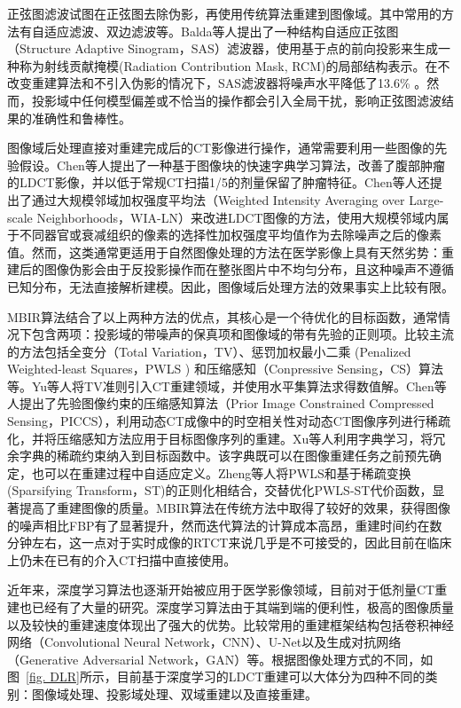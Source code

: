 正弦图滤波试图在正弦图去除伪影，再使用传统算法重建到图像域。其中常用的方法有自适应滤波、双边滤波等。Balda等人提出了一种结构自适应正弦图（Structure Adaptive Sinogram，SAS）滤波器，使用基于点的前向投影来生成一种称为射线贡献掩模(Radiation Contribution Mask, RCM)的局部结构表示。在不改变重建算法和不引入伪影的情况下，SAS滤波器将噪声水平降低了13.6\% \cite{baldaRayContributionMasks2012}。然而，投影域中任何模型偏差或不恰当的操作都会引入全局干扰，影响正弦图滤波结果的准确性和鲁棒性。

图像域后处理直接对重建完成后的CT影像进行操作，通常需要利用一些图像的先验假设。Chen等人提出了一种基于图像块的快速字典学习算法，改善了腹部肿瘤的LDCT影像，并以低于常规CT扫描1/5的剂量保留了肿瘤特征\cite{chenImprovingAbdomenTumor2013}。Chen等人还提出了通过大规模邻域加权强度平均法（Weighted Intensity Averaging over Large-scale Neighborhoods，WIA-LN）来改进LDCT图像的方法，使用大规模邻域内属于不同器官或衰减组织的像素的选择性加权强度平均值作为去除噪声之后的像素值\cite{chenImprovingLowdoseXray2010}。然而，这类通常更适用于自然图像处理的方法在医学影像上具有天然劣势：重建后的图像伪影会由于反投影操作而在整张图片中不均匀分布，且这种噪声不遵循已知分布，无法直接解析建模。因此，图像域后处理方法的效果事实上比较有限。

MBIR算法结合了以上两种方法的优点，其核心是一个待优化的目标函数，通常情况下包含两项：投影域的带噪声的保真项和图像域的带有先验的正则项。比较主流的方法包括全变分（Total Variation，TV）\cite{rudinNonlinearTotalVariation1992}、惩罚加权最小二乘 (Penalized Weighted-least Squares，PWLS )\cite{sauerLocalUpdateStrategy1993} 和压缩感知（Conpressive Sensing，CS）\cite{donohoCompressedSensing2006}算法等。Yu等人将TV准则引入CT重建领域，并使用水平集算法求得数值解\cite{yuTotalVariationBased2005}。Chen等人提出了先验图像约束的压缩感知算法（Prior Image Constrained Compressed Sensing，PICCS），利用动态CT成像中的时空相关性对动态CT图像序列进行稀疏化，并将压缩感知方法应用于目标图像序列的重建\cite{chenPriorImageConstrained2008}。Xu等人利用字典学习，将冗余字典的稀疏约束纳入到目标函数中。该字典既可以在图像重建任务之前预先确定，也可以在重建过程中自适应定义\cite{xuLowDoseXrayCT2012}。Zheng等人将PWLS和基于稀疏变换(Sparsifying Transform，ST)的正则化相结合，交替优化PWLS-ST代价函数，显著提高了重建图像的质量\cite{zhengLowDoseCT2016}。MBIR算法在传统方法中取得了较好的效果，获得图像的噪声相比FBP有了显著提升，然而迭代算法的计算成本高昂，重建时间约在数分钟左右，这一点对于实时成像的RTCT来说几乎是不可接受的，因此目前在临床上仍未在已有的介入CT扫描中直接使用。

近年来，深度学习算法也逐渐开始被应用于医学影像领域，目前对于低剂量CT重建也已经有了大量的研究。深度学习算法由于其端到端的便利性，极高的图像质量以及较快的重建速度体现出了强大的优势。比较常用的重建框架结构包括卷积神经网络（Convolutional Neural Network，CNN）、U-Net\cite{ronnebergerUNetConvolutionalNetworks2015}以及生成对抗网络（Generative Adversarial Network，GAN）\cite{goodfellowGenerativeAdversarialNets2014}等。根据图像处理方式的不同，如图~\ref{fig. DLR}所示，目前基于深度学习的LDCT重建可以大体分为四种不同的类别：图像域处理、投影域处理、双域重建以及直接重建。

